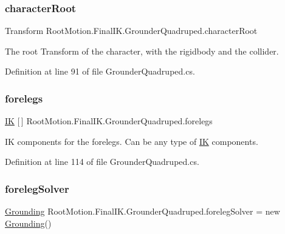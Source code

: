 \subsubsection{\texorpdfstring{character\+Root}{characterRoot}}
{\footnotesize\ttfamily Transform Root\+Motion.\+Final\+I\+K.\+Grounder\+Quadruped.\+character\+Root}



The root Transform of the character, with the rigidbody and the collider. 



Definition at line 91 of file Grounder\+Quadruped.\+cs.

\mbox{\label{class_root_motion_1_1_final_i_k_1_1_grounder_quadruped_a50487adce0ddc122a7a127c9b74148e3}} 
\subsubsection{\texorpdfstring{forelegs}{forelegs}}
{\footnotesize\ttfamily \mbox{\hyperlink{class_root_motion_1_1_final_i_k_1_1_i_k}{IK}} \mbox{[}$\,$\mbox{]} Root\+Motion.\+Final\+I\+K.\+Grounder\+Quadruped.\+forelegs}



IK components for the forelegs. Can be any type of \mbox{\hyperlink{class_root_motion_1_1_final_i_k_1_1_i_k}{IK}} components. 



Definition at line 114 of file Grounder\+Quadruped.\+cs.

\mbox{\label{class_root_motion_1_1_final_i_k_1_1_grounder_quadruped_a726fa8fbb9d7e8d0cd3b21baca6f3148}} 
\subsubsection{\texorpdfstring{foreleg\+Solver}{forelegSolver}}
{\footnotesize\ttfamily \mbox{\hyperlink{class_root_motion_1_1_final_i_k_1_1_grounding}{Grounding}} Root\+Motion.\+Final\+I\+K.\+Grounder\+Quadruped.\+foreleg\+Solver = new \mbox{\hyperlink{class_root_motion_1_1_final_i_k_1_1_grounding}{Grounding}}()}



